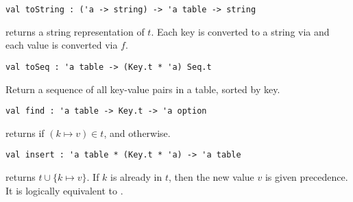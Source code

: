 \begin{cluster}
\label{grp:grm:ordtable-interface::tostring}

\begin{gram}[toString]
\label{grm:ordtable-interface::tostring}
\begin{verbatim}
val toString : ('a -> string) -> 'a table -> string
\end{verbatim}
 returns a string representation of $t$. Each key is converted
to a string via  and each value is converted via $f$.

\end{gram}
\end{cluster}

\begin{cluster}
\label{grp:grm:ordtable-interface::toseq}

\begin{gram}[toSeq]
\label{grm:ordtable-interface::toseq}
\begin{verbatim}
val toSeq : 'a table -> (Key.t * 'a) Seq.t
\end{verbatim}
Return a sequence of all key-value pairs in a table, sorted by key.

\end{gram}
\end{cluster}

\begin{cluster}
\label{grp:grm:ordtable-interface::find}

\begin{gram}[find]
\label{grm:ordtable-interface::find}
\begin{verbatim}
val find : 'a table -> Key.t -> 'a option
\end{verbatim}
 returns  if $(k \mapsto v) \in t$, and 
otherwise.

\end{gram}
\end{cluster}

\begin{cluster}
\label{grp:grm:ordtable-interface::insert}

\begin{gram}[insert]
\label{grm:ordtable-interface::insert}
\begin{verbatim}
val insert : 'a table * (Key.t * 'a) -> 'a table
\end{verbatim}
 returns $t \cup \{k \mapsto v\}$. If $k$ is already
in $t$, then the new value $v$ is given precedence. It is logically equivalent
to .

\end{gram}
\end{cluster}

